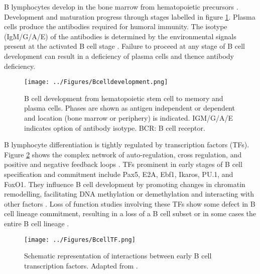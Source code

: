 \documentclass[12pt]{article}
\begin{document}
			B lymphocytes develop in the bone marrow from hematopoietic precursors \citep{Cooper15}.
			Development and maturation progress through stages labelled in figure \ref{fig:BCellDevelopment}. 
			Plasma cells produce the antibodies required for humoral immunity. 
			The isotype (IgM/G/A/E) of the antibodies is determined by the environmental signals present at the activated B cell stage \citep{Pieper13}. 
			Failure to proceed at any stage of B cell development can result in a deficiency of plasma cells and thence antibody deficiency.
			
			
			\begin{figure}[tb]
				\centering
				\texttt{[image: ../Figures/Bcelldevelopment.png]}
				\caption{B cell development from hematopoietic stem cell to memory and plasma cells. Phases are shown as antigen independent or dependent and location (bone marrow or periphery) is indicated. IGM/G/A/E indicates option of antibody isotype. BCR: B cell receptor.}
				\label{fig:BCellDevelopment}
			\end{figure}
			
			B lymphocyte differentiation is tightly regulated by transcription factors (TFs).
			Figure \ref{fig:TFBcell} shows the complex network of auto-regulation, cross regulation, and positive and negative feedback loops \citep{Choukrallah14,Polansky08,Oakes16,Zan15,Li13,Mercer11,Kulis15,McManus11}.
			TFs prominent in early stages of B cell specification and commitment include Pax5, E2A, Ebf1, Ikaros, PU.1, and FoxO1. 
			They influence B cell development by promoting changes in chromatin remodelling, facilitating DNA methylation or demethylation and interacting with other factors \citep{Gao09,Maier04,Walter08,Decker09,Lin10,McManus11,Treiber10,Zandi00}. 
			Loss of function studies involving these TFs show some defect in B cell lineage commitment, resulting in a loss of a B cell subset or in some cases the entire B cell lineage \citep{Choukrallah14}.

			
			\begin{figure}
				\centering
				\texttt{[image: ../Figures/BcellTF.png]}
				\caption{Schematic representation of interactions between early B cell transcription factors. Adapted from \citet{Choukrallah14}.}
				\label{fig:TFBcell}
			\end{figure}
		
		
\end{document}
